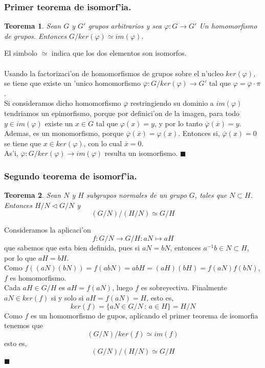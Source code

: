 \documentclass[a4paper,openright,12pt]{report}
\numberwithin{equation}{section} %
\newtheorem{teorema}{Teorema}[section] %
\newenvironment{proof}{\noindent{\it Demostracion:}}{\hfill$\blacksquare$} %
\begin{document}
\subsubsection{Primer teorema de isomorf'ia.}
\begin{teorema}
Sean $G$ y $G'$ grupos arbitrarios y sea $\varphi:G \rightarrow G'$ Un homomorfismo de grupos. Entonces $G/ker(\varphi)\simeq im(\varphi)$.
\end{teorema}
El simbolo $\simeq$ indica que los dos elementos son isomorfos.
\\
\\
\begin{proof}
Usando la factorizaci'on de homomorfismos de grupos sobre el n'ucleo $ker(\varphi)$, se tiene que existe un 'unico homomorfismo $\overline{\varphi}:G/ker(\varphi)\rightarrow G'$ tal que $\varphi=\overline{\varphi}\cdot\pi$.\\
Si consideramos dicho homomorfismo $\overline{\varphi}$ restringiendo su dominio a $im(\varphi)$ tendriamos un epimorfismo, porque por definici'on de la imagen, para todo $y \in im(\varphi)$ existe un $x \in G$ tal que $\varphi(x)=y$, y por lo tanto $\overline{\varphi}(\overline{x})=y$.\\
Ademas, es un monomorfismo, porque $\overline{\varphi}(\overline{x})=\varphi(x)$. Entonces si, $\overline{\varphi}(x)=0$ se tiene que $x \in ker(\varphi)$, con lo cual $\overline{x}=0$.\\
As'i, $\overline{\varphi}:G/ker(\varphi)\rightarrow im(\varphi)$ resulta un isomorfismo.
\end{proof}
\subsubsection{Segundo teorema de isomorf'ia.}
\begin{teorema}
Sean $N$ y $H$ subgrupos normales de un grupo $G$, tales que $N \subset H$. Entonces $H/N \triangleleft G/N$ y
\[
(G/N)/(H/N) \simeq G/H
\]
\end{teorema}
\begin{proof}
Consideramos la aplicaci'on 
\[
f:G/N \rightarrow G/H :aN \mapsto aH
\]
que sabemos que esta bien definida, pues si $aN = bN$, entonces $a^{-1}b \in N \subset H$, por lo que $aH=bH$.\\
Como $f((aN)(bN))=f(abN)=abH=(aH)(bH)=f(aN)f(bN)$, $f$ es homomorfismo.\\
Cada $aH \in G/H$ es $aH=f(aN)$, luego $f$ es sobreyectiva. Finalmente $aN \in ker(f)$ si y solo si $aH = f(aN)=H$, esto es,
\[
ker(f)=\{aN \in G/N\, : \, a \in H \}=H/N  
\]
Como $f$ es un homomorfismo de gupos, aplicando el primer teorema de isomorfia tenemos que
\[
(G/N)/ker(f) \simeq im(f)
\]
esto es,
\[
(G/N)/(H/N) \simeq G/H
\]
\end{proof}
\end{document}
